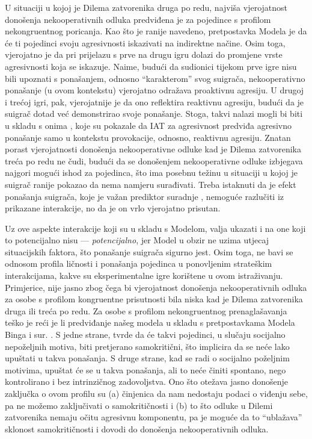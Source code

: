 \documentclass[a4paper, 12pt]{report}
\begin{document}
U situaciji u kojoj je Dilema zatvorenika druga po redu, najviša vjerojatnost
donošenja nekooperativnih odluka predviđena je za pojedince s profilom
nekongruentnog poricanja. Kao što je ranije navedeno, pretpostavka Modela je da
će ti pojedinci svoju agresivnosti iskazivati na indirektne načine. 
Osim toga, vjerojatno je da pri prijelazu s prve na drugu igru dolazi do
promjene vrste agresivnosti koja se iskazuje. Naime, budući da 
sudionici tijekom prve igre nisu bili upoznati s ponašanjem, odnosno
\enquote{karakterom} svog suigrača, nekooperativno ponašanje (u ovom kontekstu)
vjerojatno odražava proaktivnu agresiju. U drugoj i trećoj igri, pak,
vjerojatnije je da ono reflektira reaktivnu agresiju, budući da je suigrač dotad
već demonstrirao svoje ponašanje. Stoga, takvi nalazi mogli bi biti u
skladu s onima \citet{richetin2010predictive}, koje su pokazale da IAT za
agresivnost predviđa agresivno ponašanje samo u kontekstu provokacije, odnosno,
reaktivnu agresiju.
Znatan porast vjerojatnosti donošenja
nekooperativne odluke kad je Dilema zatvorenika treća po redu ne čudi, budući da
se donošenjem nekooperativne odluke izbjegava najgori mogući ishod za pojedinca,
što ima posebnu težinu u situaciji u kojoj je suigrač ranije pokazao da
nema namjeru surađivati. Treba istaknuti da je efekt ponašanja suigrača, koje
je važan prediktor suradnje \citep{balliet2013trust}, nemoguće razlučiti iz
prikazane interakcije, no da je on vrlo vjerojatno prisutan.

Uz ove aspekte interakcije koji su u skladu s Modelom, valja ukazati i na one
koji to potencijalno nisu --- \emph{potencijalno}, jer Model u obzir ne uzima
utjecaj situacijskih faktora, što ponašanje suigrača sigurno jest. Osim toga, ne bavi
se odnosom profila ličnosti i ponašanja pojedinca u ponovljenim strateškim
interakcijama, kakve su eksperimentalne igre korištene u ovom istraživanju.
Primjerice, nije jasno zbog čega bi vjerojatnost donošenja nekooperativnih
odluka za osobe s profilom kongruentne prisutnosti bila niska kad je Dilema
zatvorenika druga ili treća po redu. Za osobe s profilom nekongruentnog
prenaglašavanja teško je reći je li predviđanje našeg modela u skladu s
pretpostavkama Modela Binga i sur. \citeyearpar{bing2007integrating}.
S jedne strane, \citet{bing2007integrating} tvrde da će takvi pojedinci, u
slučaju socijalno nepoželjnih motiva, biti pretjerano samokritični,  što
implicira da se neće lako upuštati u takva ponašanja. S druge strane, kad se
radi o socijalno poželjnim motivima, upuštat će se u takva ponašanja, ali to neće
činiti spontano, nego kontrolirano i bez intrinzičnog zadovoljstva. 
Ono što otežava jasno donošenje zaključka o ovom profilu su (a) činjenica da nam
nedostaju podaci o viđenju sebe, pa ne možemo zaključivati o samokritičnosti i
(b) to što odluke u Dilemi zatvorenika nemaju očitu agresivnu komponentu, pa je
moguće da to  \enquote{ublažava} sklonost samokritičnosti i dovodi do
donošenja nekooperativnih odluka.
\end{document}
